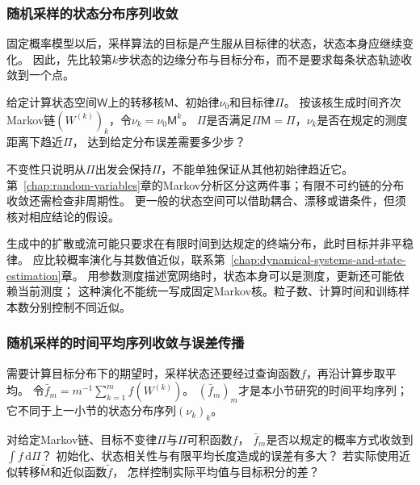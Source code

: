 \subsubsection{随机采样的状态分布序列收敛}
\label{sec:future-analysis-sampling-dynamics}

固定概率模型以后，采样算法的目标是产生服从目标律的状态，状态本身应继续变化。
因此，先比较第$k$步状态的边缘分布与目标分布，而不是要求每条状态轨迹收敛到一个点。

\begin{mathproblem}[采样状态分布是否趋近目标分布]
  \label{question:future-sampling-dynamics}
  给定计算状态空间$\mathsf W$上的转移核$\mathsf M$、初始律$\nu_0$和目标律$\Pi$。
  按该核生成时间齐次Markov链$(W^{(k)})_k$，令$\nu_k=\nu_0\mathsf M^k$。
  $\Pi$是否满足$\Pi\mathsf M=\Pi$，$\nu_k$是否在规定的测度距离下趋近$\Pi$，
  达到给定分布误差需要多少步？
\end{mathproblem}

不变性只说明从$\Pi$出发会保持$\Pi$，不能单独保证从其他初始律趋近它。
第~\ref{chap:random-variables}章的Markov分析区分这两件事；有限不可约链的分布收敛还需检查非周期性。
更一般的状态空间可以借助耦合、漂移或谱条件，但须核对相应结论的假设。

生成中的扩散或流可能只要求在有限时间到达规定的终端分布，此时目标并非平稳律。
应比较概率演化与其数值近似，联系第~\ref{chap:dynamical-systems-and-state-estimation}章。
用参数测度描述宽网络时，状态本身可以是测度，更新还可能依赖当前测度；
这种演化不能统一写成固定Markov核。粒子数、计算时间和训练样本数分别控制不同近似。

\subsubsection{随机采样的时间平均序列收敛与误差传播}
\label{sec:future-analysis-sampling-average}

需要计算目标分布下的期望时，采样状态还要经过查询函数$f$，再沿计算步取平均。
令$\bar f_m=m^{-1}\sum_{k=1}^m f(W^{(k)})$。
$(\bar f_m)_m$才是本小节研究的时间平均序列；它不同于上一小节的状态分布序列$(\nu_k)_k$。

\begin{mathproblem}[采样时间平均的积分误差]
  \label{question:future-sampling-average}
  对给定Markov链、目标不变律$\Pi$与$\Pi$可积函数$f$，
  $\bar f_m$是否以规定的概率方式收敛到$\int f\,\mathrm d\Pi$？
  初始化、状态相关性与有限平均长度造成的误差有多大？
  若实际使用近似转移$\widetilde{\mathsf M}$和近似函数$\widetilde f$，
  怎样控制实际平均值与目标积分的差？
\end{mathproblem}

